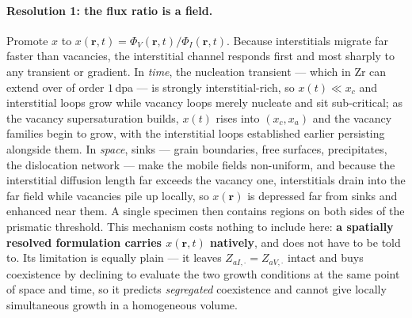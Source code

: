\documentclass{article}
\begin{document}
\paragraph{Resolution 1: the flux ratio is a field.} Promote $x$ to
$x(\bm r,t)=\Phi_V(\bm r,t)/\Phi_I(\bm r,t)$. Because interstitials migrate far
faster than vacancies, the interstitial channel responds first and most sharply
to any transient or gradient. In \emph{time}, the nucleation transient --- which
in Zr can extend over of order $1\,$dpa --- is strongly interstitial-rich, so
$x(t)\ll x_c$ and interstitial loops grow while vacancy loops merely nucleate and
sit sub-critical; as the vacancy supersaturation builds, $x(t)$ rises into
$(x_c,x_a)$ and the vacancy families begin to grow, with the interstitial loops
established earlier persisting alongside them. In \emph{space}, sinks --- grain
boundaries, free surfaces, precipitates, the dislocation network --- make the
mobile fields non-uniform, and because the interstitial diffusion length far
exceeds the vacancy one, interstitials drain into the far field while vacancies
pile up locally, so $x(\bm r)$ is depressed far from sinks and enhanced near
them. A single specimen then contains regions on both sides of the prismatic
threshold. This mechanism costs nothing to include here: \textbf{a spatially
resolved formulation carries $x(\bm r,t)$ natively}, and does not have to be told
to. Its limitation is equally plain --- it leaves $Z_{aI,\cdot}=Z_{aV,\cdot}$
intact and buys coexistence by declining to evaluate the two growth conditions
at the same point of space and time, so it predicts \emph{segregated}
coexistence and cannot give locally simultaneous growth in a homogeneous volume.
\end{document}
